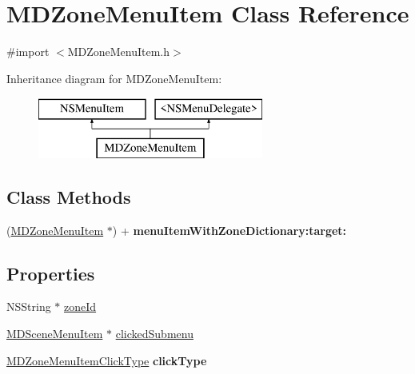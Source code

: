 \hypertarget{interface_m_d_zone_menu_item}{\section{M\-D\-Zone\-Menu\-Item Class Reference}
\label{interface_m_d_zone_menu_item}
}


{\ttfamily \#import $<$M\-D\-Zone\-Menu\-Item.\-h$>$}

Inheritance diagram for M\-D\-Zone\-Menu\-Item\-:\begin{figure}[H]
\begin{center}
\leavevmode
\includegraphics[height=2.000000cm]{interface_m_d_zone_menu_item}
\end{center}
\end{figure}
\subsection*{Class Methods}
\begin{DoxyCompactItemize}
\item 
\hypertarget{interface_m_d_zone_menu_item_ad970766700292286d251af0876aef0ab}{(\hyperlink{interface_m_d_zone_menu_item}{M\-D\-Zone\-Menu\-Item} $\ast$) + {\bfseries menu\-Item\-With\-Zone\-Dictionary\-:target\-:}}\label{interface_m_d_zone_menu_item_ad970766700292286d251af0876aef0ab}

\end{DoxyCompactItemize}
\subsection*{Properties}
\begin{DoxyCompactItemize}
\item 
N\-S\-String $\ast$ \hyperlink{interface_m_d_zone_menu_item_a0233a890891b84a2c30226439a3185ea}{zone\-Id}
\item 
\hyperlink{interface_m_d_scene_menu_item}{M\-D\-Scene\-Menu\-Item} $\ast$ \hyperlink{interface_m_d_zone_menu_item_a6a4957a6b3fe720a65aa67f6c07be18f}{clicked\-Submenu}
\item 
\hypertarget{interface_m_d_zone_menu_item_a17353c5d03094c9e62a49e1127854eb9}{\hyperlink{group___o_s_x_gab0fcddeac9a07ecadc61a58ed26c2a7a}{M\-D\-Zone\-Menu\-Item\-Click\-Type} {\bfseries click\-Type}}\label{interface_m_d_zone_menu_item_a17353c5d03094c9e62a49e1127854eb9}

\end{DoxyCompactItemize}


